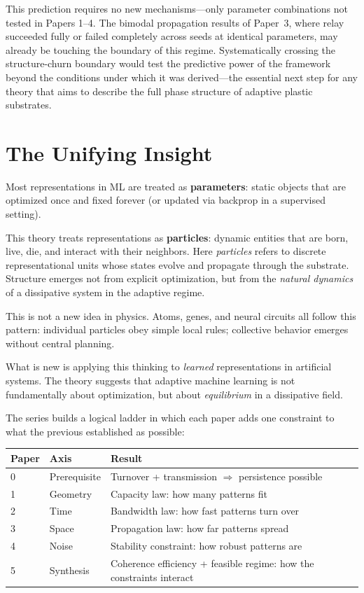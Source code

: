 \documentclass[11pt]{article}
\begin{document}
This prediction requires no new mechanisms---only parameter combinations not tested in Papers 1--4.
The bimodal propagation results of Paper~3, where relay succeeded fully or failed completely across seeds at identical parameters, may already be touching the boundary of this regime.
Systematically crossing the structure-churn boundary would test the predictive power of the framework beyond the conditions under which it was derived---the essential next step for any theory that aims to describe the full phase structure of adaptive plastic substrates.

\section{The Unifying Insight}

Most representations in ML are treated as \textbf{parameters}: static objects that are optimized once and fixed forever (or updated via backprop in a supervised setting).

This theory treats representations as \textbf{particles}: dynamic entities that are born, live, die, and interact with their neighbors. Here \emph{particles} refers to discrete representational units whose states evolve and propagate through the substrate. Structure emerges not from explicit optimization, but from the \emph{natural dynamics} of a dissipative system in the adaptive regime.

This is not a new idea in physics. Atoms, genes, and neural circuits all follow this pattern: individual particles obey simple local rules; collective behavior emerges without central planning.

What is new is applying this thinking to \emph{learned} representations in artificial systems. The theory suggests that adaptive machine learning is not fundamentally about optimization, but about \emph{equilibrium} in a dissipative field.

The series builds a logical ladder in which each paper adds one constraint to what the previous established as possible:

\begin{center}
\begin{tabular}{lll}
\toprule
\textbf{Paper} & \textbf{Axis} & \textbf{Result} \\
\midrule
0 & Prerequisite & Turnover + transmission $\Rightarrow$ persistence possible \\
1 & Geometry     & Capacity law: how many patterns fit \\
2 & Time         & Bandwidth law: how fast patterns turn over \\
3 & Space        & Propagation law: how far patterns spread \\
4 & Noise        & Stability constraint: how robust patterns are \\
5 & Synthesis    & Coherence efficiency + feasible regime: how the constraints interact \\
\bottomrule
\end{tabular}
\end{center}
\end{document}

